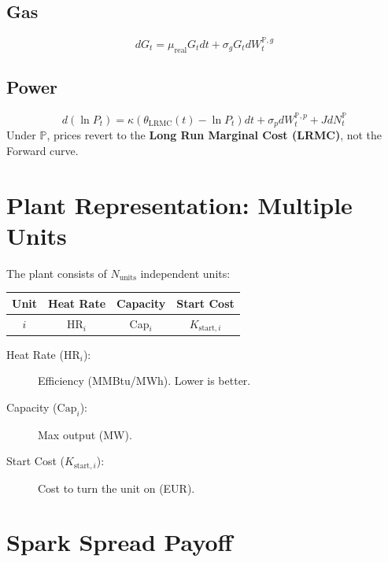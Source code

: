 \documentclass{article}
\begin{document}
\subsection{Gas}
\begin{equation}
dG_t = \mu_{\mathrm{real}} G_t dt + \sigma_g G_t dW_t^{\mathbb P,g}
\end{equation}

\subsection{Power}
\begin{equation}
d(\ln P_t) =
\kappa(\theta_{\mathrm{LRMC}}(t) - \ln P_t)dt
+ \sigma_p dW_t^{\mathbb P,p}
+ J dN_t^{\mathbb P}
\end{equation}
Under $\mathbb P$, prices revert to the \textbf{Long Run Marginal Cost (LRMC)}, not the Forward curve.

\section{Plant Representation: Multiple Units}

The plant consists of $N_{\mathrm{units}}$ independent units:

\begin{center}
\begin{tabular}{cccc}
\toprule
Unit & Heat Rate & Capacity & Start Cost \\
\midrule
$i$ & HR$_i$ & Cap$_i$ & $K_{\mathrm{start},i}$ \\
\bottomrule
\end{tabular}
\end{center}

\begin{description}
    \item[Heat Rate ($\mathrm{HR}_i$):] Efficiency (MMBtu/MWh). Lower is better.
    \item[Capacity ($\mathrm{Cap}_i$):] Max output (MW).
    \item[Start Cost ($K_{\mathrm{start},i}$):] Cost to turn the unit on (EUR).
\end{description}

\section{Spark Spread Payoff}
\end{document}
